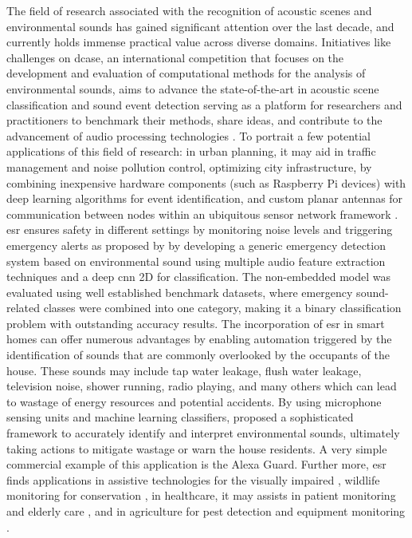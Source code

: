 The field of research associated with the recognition of acoustic scenes and environmental sounds has gained significant attention over the last decade, and currently holds immense practical value across diverse domains. Initiatives like challenges on \gls{dcase}, an international competition that focuses on the development and evaluation of computational methods for the analysis of environmental sounds, aims to advance the state-of-the-art in acoustic scene classification and sound event detection serving as a platform for researchers and practitioners to benchmark their methods, share ideas, and contribute to the advancement of audio processing technologies \cite{Mesaros2019}. To portrait a few potential applications of this field of research: in urban planning, it may aid in traffic management and noise pollution control, optimizing city infrastructure, by combining inexpensive hardware components (such as Raspberry Pi devices) with deep learning algorithms for event identification, and custom planar antennas for communication between nodes within an ubiquitous sensor network framework \cite{VidaaVila2020}. \gls{esr} ensures safety in different settings by monitoring noise levels and triggering emergency alerts as proposed by \textcite{Sharma2021} by developing a generic emergency detection system based on environmental sound using multiple audio feature extraction techniques and a deep \gls{cnn} 2D for classification. The non-embedded model was evaluated using well established benchmark datasets, where emergency sound-related classes were combined into one category, making it a binary classification problem with outstanding accuracy results. The incorporation of \gls{esr} in smart homes can offer numerous advantages by enabling automation triggered by the identification of sounds that are commonly overlooked by the occupants of the house. These sounds may include tap water leakage, flush water leakage, television noise, shower running, radio playing, and many others which can lead to wastage of energy resources and potential accidents. By using microphone sensing units and machine learning classifiers, \textcite{Pandya2021} proposed a sophisticated framework to accurately identify and interpret environmental sounds, ultimately taking actions to mitigate wastage or warn the house residents. A very simple commercial example of this application is the Alexa Guard. Further more, \gls{esr} finds applications in assistive technologies for the visually impaired \cite{Huang2023}, wildlife monitoring for conservation \cite{Jeantet2023}, in healthcare, it may assists in patient monitoring \cite{Fukuyama2022} and elderly care \cite{Saraubon2018}, and in agriculture for pest detection \cite{Branding2023} and equipment monitoring \cite{Jeong2022}.  

